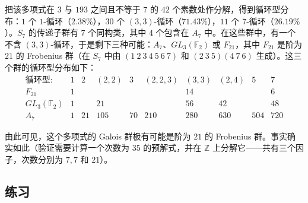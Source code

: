 \begin{enumerate}
把该多项式在 $3$ 与 $193$ 之间且不等于 $7$ 的 $42$ 个素数处作分解，得到循环型分布：$1$ 个 $1$-循环（$2.38\%$），$30$ 个 $(3,3)$-循环（$71.43\%$），$11$ 个 $7$-循环（$26.19\%$）。$S_7$ 的传递子群有 $7$ 个同构类，其中 $4$ 个包含在 $A_7$ 中。在这些群中，有一个不含 $(3,3)$-循环，于是剩下三种可能：$A_7$、$GL_3(\mathbb F_2)$ 或 $F_{21}$，其中 $F_{21}$ 是阶为 $21$ 的 Frobenius 群（在 $S_7$ 中由 $(1\ 2\ 3\ 4\ 5\ 6\ 7)$ 和 $(2\ 3\ 5)(4\ 7\ 6)$ 生成）。这三个群的循环型分布如下：
\[
\begin{array}{c|rrrrrrrrr}
\text{循环型:} & 1 & 2 & (2,2) & 3 & (2,2,3) & (3,3) & (2,4) & 5 & 7\\ \hline
F_{21}           & 1 &   &     &    &     & 14  &     &     & 6\\
GL_3(\mathbb F_2)& 1 &   & 21  &    &     & 56  & 42  &     & 48\\
A_7              & 1 &21 &105  & 70 & 210 & 280 & 630 & 504 & 720
\end{array}
\]

由此可见，这个多项式的 Galois 群极有可能是阶为 $21$ 的 Frobenius 群。事实确实如此（验证需要计算一个次数为 $35$ 的预解式，并在 $\mathbb Z$ 上分解它——共有三个因子，次数分别为 $7,7$ 和 $21$）。
\end{enumerate}

\subsection*{练习}

